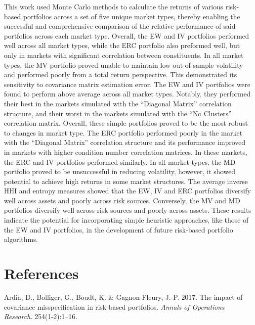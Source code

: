 \documentclass[11pt,preprint, authoryear]{elsarticle}
\numberwithin{equation}{section}
\numberwithin{figure}{section}
\numberwithin{table}{section}
\begin{document}
This work used Monte Carlo methods to calculate the returns of various
risk-based portfolios across a set of five unique market types, thereby
enabling the successful and comprehensive comparison of the relative
performance of said portfolios across each market type. Overall, the EW
and IV portfolios performed well across all market types, while the ERC
portfolio also preformed well, but only in markets with significant
correlation between constituents. In all market types, the MV portfolio
proved unable to maintain low out-of-sample volatility and performed
poorly from a total return perspective. This demonstrated its
sensitivity to covariance matrix estimation error. The EW and IV
portfolios were found to perform above average across all market types.
Notably, they performed their best in the markets simulated with the
``Diagonal Matrix'' correlation structure, and their worst in the
markets simulated with the ``No Clusters'' correlation matrix. Overall,
these simple portfolios proved to be the most robust to changes in
market type. The ERC portfolio performed poorly in the market with the
``Diagonal Matrix'' correlation structure and its performance improved
in markets with higher condition number correlation matrices. In these
markets, the ERC and IV portfolios performed similarly. In all market
types, the MD portfolio proved to be unsuccessful in reducing
volatility, however, it showed potential to achieve high returns in some
market structures. The average inverse HHI and entropy measures showed
that the EW, IV and ERC portfolios diversify well across assets and
poorly across risk sources. Conversely, the MV and MD portfolios
diversify well across risk sources and poorly across assets. These
results indicate the potential for incorporating simple heuristic
approaches, like those of the EW and IV portfolios, in the development
of future risk-based portfolio algorithms.

\newpage

\hypertarget{references}{%
\section*{References}\label{references}}

\hypertarget{refs}{}
\leavevmode\hypertarget{ref-ardia2017}{}%
Ardia, D., Bolliger, G., Boudt, K. \& Gagnon-Fleury, J.-P. 2017. The
impact of covariance misspecification in risk-based portfolios.
\emph{Annals of Operations Research}. 254(1-2):1--16.
\end{document}
